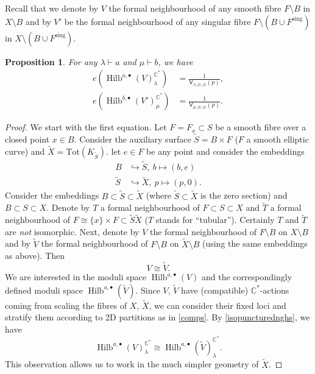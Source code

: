 \documentclass{amsart}
\newtheorem{proposition}[theorem]{Proposition}
\theoremstyle{definition}
\newcommand{\CC} {\mathbb{C}}          %
\newcommand{\sfV}{\mathsf{V}}
\newcommand{\Hilb}{\operatorname{Hilb}}
\newcommand{\sing}{\operatorname{sing}}
\begin{document}
Recall that we denote by $V$ the formal neighbourhood of any smooth fibre $F \setminus B$ in $X \setminus B$ and by $V'$ be the formal neighbourhood of any singular fibre $F \setminus (B \cup F^{\sing})$ in $X \setminus (B \cup F^{\sing})$. 
\begin{proposition} \label{vertex2}
For any $\lambda \vdash a$ and $\mu \vdash b$, we have
\begin{align*}
e(\Hilb^{a,\bullet}(V)_{\lambda}^{\CC^*}) &= \frac{1}{\sfV_{\lambda,\varnothing,\varnothing}(p)}, \\
e(\Hilb^{b,\bullet}(V')_{\mu}^{\CC^*}) &= \frac{1}{\sfV_{\mu,\varnothing,\varnothing}(p)}.
\end{align*}
\end{proposition}
\begin{proof}
We start with the first equation. Let $F = F_x \subset S$ be a smooth fibre over a closed point $x \in B$. Consider the auxiliary surface $\tilde{S} = B \times F$ ($F$ a smooth elliptic curve) and $\tilde{X} = \mathrm{Tot}(K_{\tilde{S}})$. let $e \in F$ be any point and consider the embeddings 
\begin{align*}
B &\hookrightarrow \tilde{S}, \ b \mapsto (b,e) \\
\tilde{S} &\hookrightarrow \tilde{X}, \ p \mapsto (p,0).
\end{align*}
Consider the embeddings $B \subset \tilde{S} \subset \tilde{X}$ (where $\tilde{S} \subset \tilde{X}$ is the zero section) and $B \subset S \subset X$. Denote by $T$ a formal neighbourhood of $F \subset S \subset X$ and $\tilde{T}$ a formal neighbourhood of $F \cong \{x\} \times F \subset \tilde{S} \tilde{X}$ ($T$ stands for ``tubular''). Certainly $T$ and $\tilde{T}$ are \emph{not} isomorphic. Next, denote by $V$ the formal neighbourhood of $F \setminus B$ on $X \setminus B$ and by $\tilde{V}$ the formal neighbourhood of $F \setminus B$ on $\tilde{X} \setminus B$ (using the same embeddings as above). Then 
\begin{equation} \label{isopuncturednghs}
V \cong \tilde{V}.
\end{equation}
We are interested in the moduli space $\Hilb^{a,\bullet}(V)$ and the correspondingly defined moduli space $\Hilb^{a,\bullet}(\tilde{V})$. Since $V$, $\tilde{V}$ have (compatible) $\CC^*$-actions coming from scaling the fibres of $X$, $\tilde{X}$, we can consider their fixed loci and stratify them according to 2D partitions as in \ref{comps}. By \eqref{isopuncturednghs}, we have    
$$
\Hilb^{a,\bullet}(V)_{\lambda}^{\CC^*} \cong \Hilb^{a,\bullet}(\tilde{V})_{\lambda}^{\CC^*}.
$$
This observation allows us to work in the much simpler geometry of $\tilde{X}$.


\end{proof}
\end{document}
